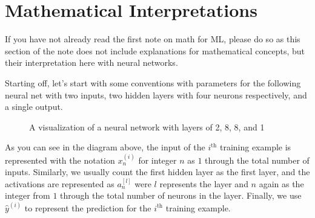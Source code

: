 \documentclass[../../main.tex]{subfiles}
\begin{document}
\section{Mathematical Interpretations}

If you have not already read the first note on math for ML,
please do so as this section of the note does not include explanations
for mathematical concepts, but their interpretation here with
neural networks.

Starting off, let's start with some conventions with parameters for
the following neural net with two inputs, two hidden layers with
four neurons respectively, and a single output.

\begin{figure}[H]
\centering
{}
\caption{A visualization of a neural network with layers of 2, 8,
         8, and 1}
\end{figure}

As you can see in the diagram above, the input of the $i^\text{th}$
training example is represented with the notation $x_n^{(i)}$ for
integer $n$ as $1$ through the total number of inputs. Similarly,
we usually count the first hidden layer as the first layer, and the
activations are represented as $a_n^{[l]}$ were $l$ represents the
layer and $n$ again as the integer from $1$ through the total number
of neurons in the layer. Finally, we use $\hat{y}^{(i)}$ to
represent the prediction for the $i^\text{th}$ training example.
\end{document}
